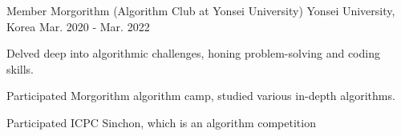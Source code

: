 \begin{cventries}

\cventry
{Member} %
{Morgorithm (Algorithm Club at Yonsei University)} %
{Yonsei University, Korea} %
{Mar. 2020 - Mar. 2022} %
{ %
\begin{cvitems}
\item {Delved deep into algorithmic challenges, honing problem-solving and coding skills.}
\item {Participated Morgorithm algorithm camp, studied various in-depth algorithms.}
\item {Participated ICPC Sinchon, which is an algorithm competition}
\end{cvitems}
}


\end{cventries}
